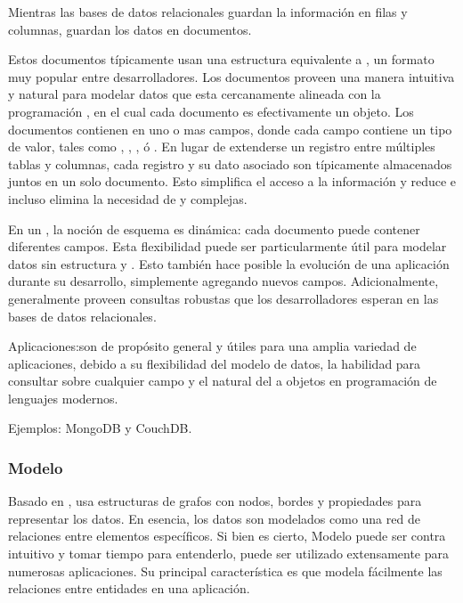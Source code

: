  Mientras las bases de datos relacionales guardan la información en filas y columnas, \documentDB \dataBases guardan los datos en documentos.  

Estos documentos típicamente usan una estructura equivalente a \json, un formato muy popular entre desarrolladores. Los documentos proveen una manera intuitiva y natural para modelar datos que esta cercanamente alineada con la programación \objectOriented, en el cual cada documento es efectivamente un objeto. Los documentos contienen en uno o mas campos, donde cada campo contiene un tipo de valor, tales como \stringCustom, \dateCustom, \binaryCustom, ó \arrayCustom. En lugar de extenderse un registro entre múltiples tablas y columnas, cada registro y su dato asociado son típicamente almacenados juntos en un solo documento. Esto simplifica el acceso a la información y reduce e incluso elimina la necesidad de \joins y \transactionsDB complejas.

En un \documentDB \dataBase, la noción de esquema es dinámica: cada documento puede contener diferentes campos. Esta flexibilidad puede ser particularmente útil para modelar datos sin estructura y \polymorphic. Esto también hace posible la evolución de una aplicación durante su desarrollo, simplemente agregando nuevos campos. Adicionalmente, \documentDB \dataBases generalmente proveen consultas robustas que los desarrolladores esperan en las bases de datos relacionales.

Aplicaciones:\documentDB \dataBases son de propósito general y útiles para una amplia variedad de aplicaciones, debido a su flexibilidad del modelo de datos, la habilidad para consultar sobre cualquier campo y el \mapping natural del \documentDB \dataModel a objetos en programación de lenguajes modernos.

Ejemplos: MongoDB y CouchDB.

\subsubsection{Modelo \graphCustom}
\label{cap:justificacion_proyecto:base_datos:nosql:graph_model}

Basado en \graphTheory, usa estructuras de grafos con nodos, bordes y propiedades para representar los datos. En esencia, los datos son modelados como una red de relaciones entre elementos específicos. Si bien es cierto, Modelo \graphCustom puede ser contra intuitivo y tomar tiempo para entenderlo, puede ser utilizado extensamente para numerosas aplicaciones. Su principal característica es que modela fácilmente las relaciones entre entidades en una aplicación.

